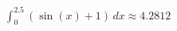 \documentclass[preview]{standalone}
\begin{document}
\begin{align*}
\int_{0}^{2.5} \left(\sin(x) + 1\right) \, dx \approx 4.2812
\end{align*}
\end{document}
